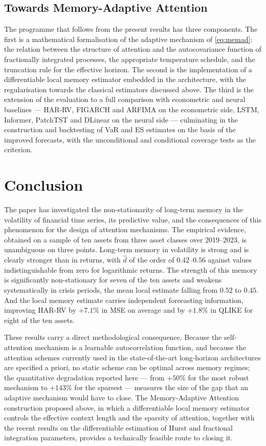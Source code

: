 \documentclass[journal]{IEEEtran}
\begin{document}
\subsection{Towards Memory-Adaptive Attention}\label{sec:outlook}

The programme that follows from the present results has three components. The first is a
mathematical formalisation of the adaptive mechanism of \eqref{eq:memad}: the relation between the
structure of attention and the autocovariance function of fractionally integrated processes, the
appropriate temperature schedule, and the truncation rule for the effective horizon. The second is
the implementation of a differentiable local memory estimator embedded in the architecture, with
the regularisation towards the classical estimators discussed above. The third is the extension
of the evaluation to a full comparison with econometric and neural baselines --- HAR-RV, FIGARCH
and ARFIMA on the econometric side, LSTM, Informer, PatchTST and DLinear on the neural side ---
culminating in the construction and backtesting of VaR and ES estimates on the basis of the
improved forecasts, with the unconditional and conditional coverage tests as the criterion.

\section{Conclusion}\label{sec:concl}

The paper has investigated the non-stationarity of long-term memory in the volatility of financial
time series, its predictive value, and the consequences of this phenomenon for the design of
attention mechanisms. The empirical evidence, obtained on a sample of ten assets from three asset
classes over 2019--2023, is unambiguous on three points. Long-term memory in volatility is
strong and is clearly stronger than in returns, with $\hat d$ of the order of $0.42$--$0.56$
against values indistinguishable from zero for logarithmic returns. The strength of this memory is
significantly non-stationary for seven of the ten assets and weakens systematically in crisis
periods, the mean local estimate falling from $0.52$ to $0.45$. And the local memory estimate
carries independent forecasting information, improving HAR-RV by $+7.1\%$ in MSE on average and by
$+1.8\%$ in QLIKE for eight of the ten assets.

These results carry a direct methodological consequence. Because the self-attention mechanism is a
learnable autocorrelation function, and because the attention schemes currently used in the
state-of-the-art long-horizon architectures are specified a priori, no static scheme can be
optimal across memory regimes; the quantitative degradation reported here --- from $+50\%$ for the
most robust mechanism to $+143\%$ for the sparsest --- measures the size of the gap that an
adaptive mechanism would have to close. The Memory-Adaptive Attention construction proposed
above, in which a differentiable local memory estimator controls the effective context length and
the sparsity of attention, together with the recent results on the differentiable estimation of
Hurst and fractional integration parameters, provides a technically feasible route to closing it.
\end{document}
